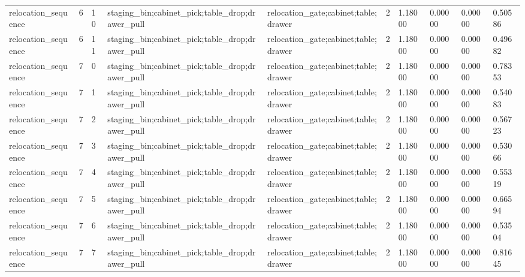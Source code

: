 \documentclass{article}
\begin{document}
\begin{table}[tbp]
{\begin{tabular}{llllllllll}
relocation\_sequence & 6 & 10 & staging\_bin;cabinet\_pick;table\_drop;drawer\_pull & relocation\_gate;cabinet;table;drawer & 2 & 1.18000 & 0.00000 & 0.00000 & 0.50586 \\
relocation\_sequence & 6 & 11 & staging\_bin;cabinet\_pick;table\_drop;drawer\_pull & relocation\_gate;cabinet;table;drawer & 2 & 1.18000 & 0.00000 & 0.00000 & 0.49682 \\
relocation\_sequence & 7 & 0 & staging\_bin;cabinet\_pick;table\_drop;drawer\_pull & relocation\_gate;cabinet;table;drawer & 2 & 1.18000 & 0.00000 & 0.00000 & 0.78353 \\
relocation\_sequence & 7 & 1 & staging\_bin;cabinet\_pick;table\_drop;drawer\_pull & relocation\_gate;cabinet;table;drawer & 2 & 1.18000 & 0.00000 & 0.00000 & 0.54083 \\
relocation\_sequence & 7 & 2 & staging\_bin;cabinet\_pick;table\_drop;drawer\_pull & relocation\_gate;cabinet;table;drawer & 2 & 1.18000 & 0.00000 & 0.00000 & 0.56723 \\
relocation\_sequence & 7 & 3 & staging\_bin;cabinet\_pick;table\_drop;drawer\_pull & relocation\_gate;cabinet;table;drawer & 2 & 1.18000 & 0.00000 & 0.00000 & 0.53066 \\
relocation\_sequence & 7 & 4 & staging\_bin;cabinet\_pick;table\_drop;drawer\_pull & relocation\_gate;cabinet;table;drawer & 2 & 1.18000 & 0.00000 & 0.00000 & 0.55319 \\
relocation\_sequence & 7 & 5 & staging\_bin;cabinet\_pick;table\_drop;drawer\_pull & relocation\_gate;cabinet;table;drawer & 2 & 1.18000 & 0.00000 & 0.00000 & 0.66594 \\
relocation\_sequence & 7 & 6 & staging\_bin;cabinet\_pick;table\_drop;drawer\_pull & relocation\_gate;cabinet;table;drawer & 2 & 1.18000 & 0.00000 & 0.00000 & 0.53504 \\
relocation\_sequence & 7 & 7 & staging\_bin;cabinet\_pick;table\_drop;drawer\_pull & relocation\_gate;cabinet;table;drawer & 2 & 1.18000 & 0.00000 & 0.00000 & 0.81645 \\
\bottomrule
\end{tabular}
}
\end{table}

\clearpage
\end{document}
